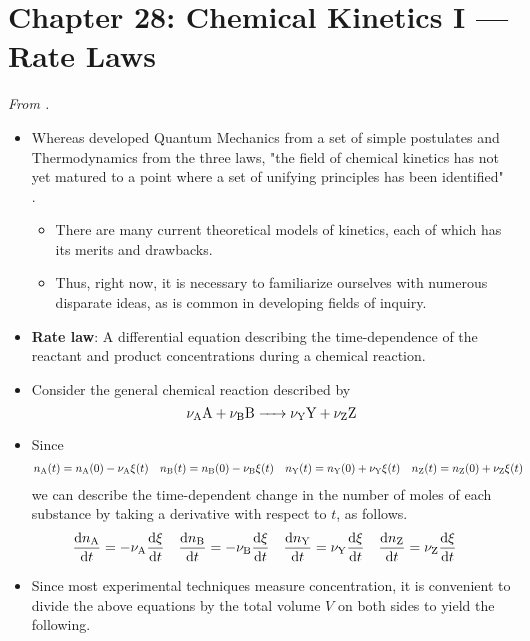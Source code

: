 \documentclass[../notes.tex]{subfiles}
\begin{document}
\section{Chapter 28: Chemical Kinetics I --- Rate Laws}
\emph{From \textcite{bib:McQuarrieSimon}.}
\begin{itemize}
    \item {}Whereas \textcite{bib:McQuarrieSimon} developed Quantum Mechanics from a set of simple postulates and Thermodynamics from the three laws, "the field of chemical kinetics has not yet matured to a point where a set of unifying principles has been identified" \parencite[1047]{bib:McQuarrieSimon}.
    \begin{itemize}
        \item There are many current theoretical models of kinetics, each of which has its merits and drawbacks.
        \item Thus, right now, it is necessary to familiarize ourselves with numerous disparate ideas, as is common in developing fields of inquiry.
    \end{itemize}
    \item \textbf{Rate law}: A differential equation describing the time-dependence of the reactant and product concentrations during a chemical reaction.
    \item Consider the general chemical reaction described by
    \begin{equation*}
        \ce{$\nu_{\text{A}}$A + $\nu_{\text{B}}$B -> $\nu_{\text{Y}}$Y + $\nu_{\text{Z}}$Z}
    \end{equation*}
    \item Since
    \begin{align*}
        n_{\ce{A}}(t) &= n_{\ce{A}}(0)-\nu_{\ce{A}}\xi(t)&
        n_{\ce{B}}(t) &= n_{\ce{B}}(0)-\nu_{\ce{B}}\xi(t)&
        n_{\ce{Y}}(t) &= n_{\ce{Y}}(0)+\nu_{\ce{Y}}\xi(t)&
        n_{\ce{Z}}(t) &= n_{\ce{Z}}(0)+\nu_{\ce{Z}}\xi(t)
    \end{align*}
    we can describe the time-dependent change in the number of moles of each substance by taking a derivative with respect to $t$, as follows.
    \begin{align*}
        \dv{n_{\ce{A}}}{t} &= -\nu_{\ce{A}}\dv{\xi}{t}&
        \dv{n_{\ce{B}}}{t} &= -\nu_{\ce{B}}\dv{\xi}{t}&
        \dv{n_{\ce{Y}}}{t} &= \nu_{\ce{Y}}\dv{\xi}{t}&
        \dv{n_{\ce{Z}}}{t} &= \nu_{\ce{Z}}\dv{\xi}{t}
    \end{align*}
    \item Since most experimental techniques measure concentration, it is convenient to divide the above equations by the total volume $V$ on both sides to yield the following.

\end{itemize}
\end{document}
